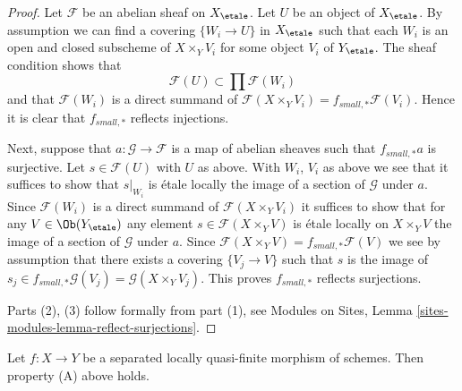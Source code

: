 \begin{proof}
Let $\mathcal{F}$ be an abelian sheaf on $X_\etale$.
Let $U$ be an object of $X_\etale$. By assumption we can find a
covering $\{W_i \to U\}$ in $X_\etale$ such that each $W_i$ is
an open and closed subscheme of $X \times_Y V_i$ for some object
$V_i$ of $Y_\etale$. The sheaf condition shows that
$$
\mathcal{F}(U) \subset \prod \mathcal{F}(W_i)
$$
and that $\mathcal{F}(W_i)$ is a direct summand of
$\mathcal{F}(X \times_Y V_i) = f_{small, *}\mathcal{F}(V_i)$.
Hence it is clear that $f_{small, *}$ reflects injections.

\medskip\noindent
Next, suppose that $a : \mathcal{G} \to \mathcal{F}$ is a map of
abelian sheaves such that $f_{small, *}a$ is surjective. Let
$s \in \mathcal{F}(U)$ with $U$ as above. With $W_i$, $V_i$ as
above we see that it suffices to show that $s|_{W_i}$ is \'etale locally
the image of a section of $\mathcal{G}$ under $a$. Since $\mathcal{F}(W_i)$
is a direct summand of $\mathcal{F}(X \times_Y V_i)$
it suffices to show that for any $V \in \Ob(Y_\etale)$
any element $s \in \mathcal{F}(X \times_Y V)$
is \'etale locally on $X \times_Y V$ the image of a section of
$\mathcal{G}$ under $a$. Since
$\mathcal{F}(X \times_Y V) = f_{small, *}\mathcal{F}(V)$
we see by assumption that there exists a covering $\{V_j \to V\}$ such that
$s$ is the image of
$s_j \in f_{small, *}\mathcal{G}(V_j) = \mathcal{G}(X \times_Y V_j)$.
This proves $f_{small, *}$ reflects surjections.

\medskip\noindent
Parts (2), (3) follow formally from part (1), see
Modules on Sites, Lemma \ref{sites-modules-lemma-reflect-surjections}.
\end{proof}

\begin{lemma}
\label{lemma-locally-quasi-finite-A}
Let $f : X \to Y$ be a separated locally quasi-finite morphism of schemes.
Then property (A) above holds.
\end{lemma}

